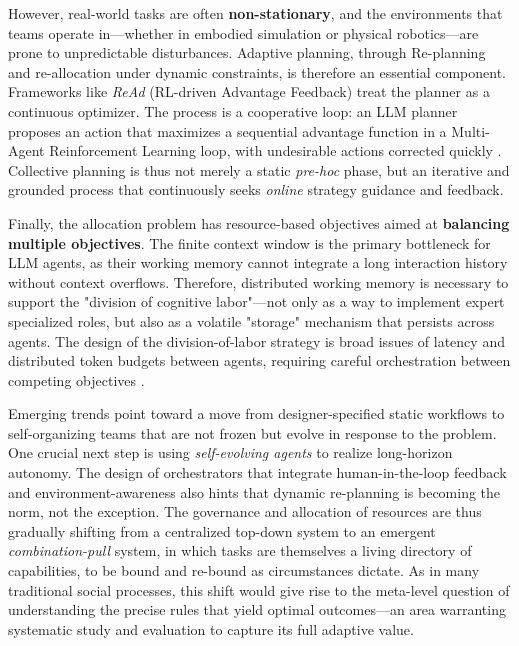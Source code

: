 \documentclass[11pt,a4paper]{article}
\begin{document}
However, real-world tasks are often \textbf{non-stationary}, and the environments that teams operate in---whether in embodied simulation or physical robotics---are prone to unpredictable disturbances. Adaptive planning, through Re-planning and re-allocation under dynamic constraints, is therefore an essential component. Frameworks like \emph{ReAd} (RL-driven Advantage Feedback) treat the planner as a continuous optimizer. The process is a cooperative loop: an LLM planner proposes an action that maximizes a sequential advantage function in a Multi-Agent Reinforcement Learning loop, with undesirable actions corrected quickly \cite{arxiv:2405.14314v2}. Collective planning is thus not merely a static \emph{pre-hoc} phase, but an iterative and grounded process that continuously seeks \emph{online} strategy guidance and feedback.

Finally, the allocation problem has resource-based objectives aimed at \textbf{balancing multiple objectives}. The finite context window is the primary bottleneck for LLM agents, as their working memory cannot integrate a long interaction history without context overflows. Therefore, distributed working memory is necessary to support the "division of cognitive labor"---not only as a way to implement expert specialized roles, but also as a volatile "storage" mechanism that persists across agents. The design of the division-of-labor strategy is broad issues of latency and distributed token budgets between agents, requiring careful orchestration between competing objectives \cite{arxiv:2308.05960v1,arxiv:1204.1581v1}.

Emerging trends point toward a move from designer-specified static workflows to self-organizing teams that are not frozen but evolve in response to the problem. One crucial next step is using \emph{self-evolving agents} to realize long-horizon autonomy. The design of orchestrators that integrate human-in-the-loop feedback and environment-awareness also hints that dynamic re-planning is becoming the norm, not the exception. The governance and allocation of resources are thus gradually shifting from a centralized top-down system to an emergent \emph{combination-pull} system, in which tasks are themselves a living directory of capabilities, to be bound and re-bound as circumstances dictate. As in many traditional social processes, this shift would give rise to the meta-level question of understanding the precise rules that yield optimal outcomes---an area warranting systematic study and evaluation to capture its full adaptive value.
\end{document}
